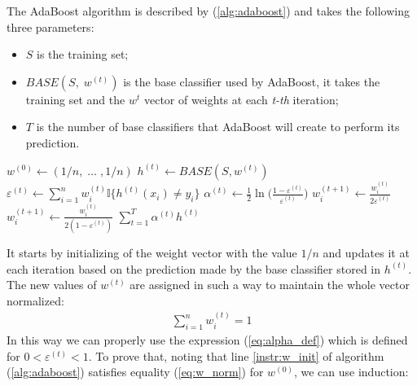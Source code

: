 The AdaBoost algorithm is described by (\ref{alg:adaboost}) and takes the following three parameters:
\begin{itemize}
	\item $S$ is the training set;
	\item $BASE(S,\;w^{(t)})$ is the base classifier used by AdaBoost, it takes the training set and the $w^{t}$ vector of weights at each \textit{t-th} iteration;
	\item $T$ is the number of base classifiers that AdaBoost will create to perform its prediction.
\end{itemize}
\begin{algorithm}[htpb]
	\caption{}
	\label{alg:adaboost}
	\begin{algorithmic}[2]
		\State $w^{(0)} \gets (1/n,\;\dots\;,1/n)$ \label{instr:w_init}
			\State $h^{(t)} \gets BASE(S, w^{(t)})$
			\State $\varepsilon^{(t)} \gets \sum_{i=1}^{n}w_{i}^{(t)}\mathbb{I}\lbrace h^{(t)}(x_{i}) \neq y_{i} \rbrace $
			\State $\alpha^{(t)} \gets \frac{1}{2}\ln\Big(\frac{1-\varepsilon^{(t)}}{\varepsilon^{(t)}}\Big)$
					\State $w_{i}^{(t+1)}\gets\frac{w_{i}^{(t)}}{2\varepsilon^{(t)}}$
				\Else
					\State $w_{i}^{(t+1)}\gets\frac{w_{i}^{(t)}}{2(1-\varepsilon^{(t)})}$
				\EndIf
			\EndFor
		\EndFor
		\Return $\sum_{t=1}^{T}\alpha^{(t)}h^{(t)}$
		\EndProcedure
	\end{algorithmic}
\end{algorithm}
It starts by initializing of the weight vector with the value $1/n$ and updates it at each iteration based on the prediction made by the base classifier stored in $h^{(t)}$. The new values of $w^{(t)}$ are assigned in such a way to maintain the whole vector normalized:
\begin{align}
	\label{eq:w_norm}
	\sum_{i=1}^{n}w^{(t)}_{i} = 1
\end{align}
In this way we can properly use the expression (\ref{eq:alpha_def}) which is defined for $0 < \varepsilon^{(t)} < 1$.
To prove that, noting that line \ref{instr:w_init} of algorithm (\ref{alg:adaboost}) satisfies equality (\ref{eq:w_norm}) for $w^{(0)}$, we can use induction:
